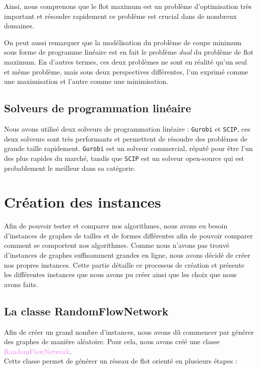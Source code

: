 \documentclass[a4paper]{article}
\begin{document}
Ainsi, nous comprenons que le flot maximum est un problème d'optimisation très important et résoudre rapidement ce problème est crucial dans de nombreux domaines.

On peut aussi remarquer que la modélisation du problème de coupe minimum sous forme de programme linéaire est en fait le problème \emph{dual} du problème de flot maximum. En d'autres termes, ces deux problèmes ne sont en réalité qu'un seul et même problème, mais sous deux perspectives différentes, l'un exprimé comme une maximisation et l'autre comme une minimisation.
\subsection{Solveurs de programmation linéaire}
Nous avons utilisé deux solveurs de programmation linéaire : \texttt{Gurobi} et \texttt{SCIP}, ces deux solveurs sont très performants et permettent de résoudre des problèmes de grande taille rapidement. \texttt{Gurobi} est un solveur commercial, réputé pour être l'un des plus rapides du marché, tandis que \texttt{SCIP} est un solveur open-source qui est probablement le meilleur dans sa catégorie.


\section{Création des instances}

Afin de pouvoir tester et comparer nos algorithmes, nous avons eu besoin d'instances de graphes de tailles et de formes différentes afin de pouvoir comparer comment se comportent nos algorithmes. Comme nous n'avons pas trouvé d'instances de graphes suffisamment grandes en ligne, nous avons décidé de créer nos propres instances. Cette partie détaille ce processus de création et présente les différentes instances que nous avons pu créer ainsi que les choix que nous avons faits.

\subsection{La classe RandomFlowNetwork}
Afin de créer un grand nombre d'instances, nous avons dû commencer par générer des graphes de manière aléatoire. Pour cela, nous avons créé une classe \textcolor{violet}{RandomFlowNetwork}.\\

Cette classe permet de générer un réseau de flot orienté en plusieurs étapes :
\end{document}
